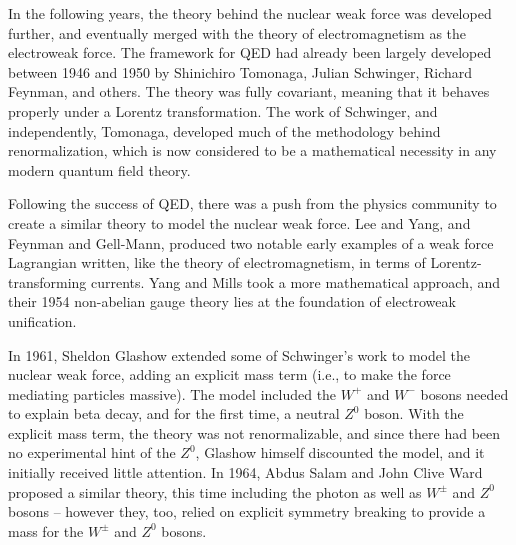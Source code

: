 In the following years, the theory behind the nuclear weak force was developed further, and eventually merged with the theory of electromagnetism as the electroweak force.  The framework for \ac{QED} had already been largely developed between 1946 and 1950 by Shinichiro Tomonaga, Julian Schwinger, Richard Feynman, and others.  The theory was fully covariant, meaning that it behaves properly under a Lorentz transformation.  The work of Schwinger, and independently, Tomonaga, developed much of the methodology behind renormalization, which is now considered to be a mathematical necessity in any modern quantum field theory\cite{tomonaga1946}\cite{schwinger1948covariant}\cite{feynman1949spacetime}\cite{feynman1949positrons}\cite{feynman1950}\cite{dyson1949theories}.  ~



Following the success of QED, there was a push from the physics community to create a similar theory to model the nuclear weak force.  
%
Lee and Yang, and Feynman and Gell-Mann, produced two notable early examples of a weak force Lagrangian written, like the theory of electromagnetism, in terms of Lorentz-transforming currents\cite{LeeYang}\cite{FeynmanGellMann1958}.  Yang and Mills took a more mathematical approach, and their 1954 non-abelian gauge theory \cite{YangMills1954} lies at the foundation of electroweak unification.  
%

In 1961, Sheldon Glashow extended some of Schwinger's work to model the nuclear weak force,  adding an explicit mass term (i.e., to make the force mediating particles massive).  The model included the $W^+$ and $W^-$ bosons needed to explain beta decay, and for the first time, a neutral $Z^0$ boson.  With the explicit mass term, the theory was not renormalizable, and since there had been no experimental hint of the $Z^0$, Glashow himself discounted the model, and it initially received little attention.  In 1964, Abdus Salam and John Clive Ward proposed a similar theory, this time including the photon as well as $W^\pm$ and $Z^0$ bosons -- however they, too, relied on explicit symmetry breaking to provide a mass for the $W^\pm$ and $Z^0$ bosons\cite{Glashow1959}\cite{Glashow1961}\cite{SalamWard1964}.


